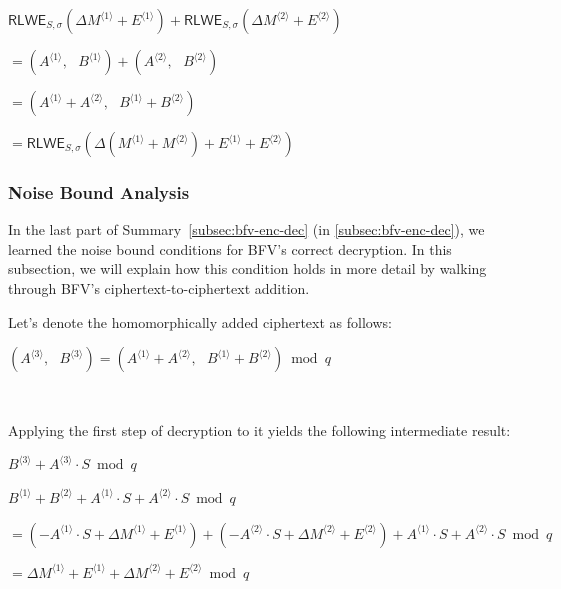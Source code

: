 \begin{tcolorbox}[title={\textbf{\tboxlabel{\ref*{subsec:bfv-add-cipher}} BFV Ciphertext-to-Ciphertext Addition}}]
$\textsf{RLWE}_{S, \sigma}(\Delta M^{\langle 1 \rangle} + E^{\langle 1 \rangle} ) + \textsf{RLWE}_{S, \sigma}(\Delta M^{\langle 2 \rangle} + E^{\langle 2 \rangle}) $

$ = ( A^{\langle 1 \rangle}, \text{ } B^{\langle 1 \rangle}) + (A^{\langle 2 \rangle}, \text{ } B^{\langle 2 \rangle}) $

$ = ( A^{\langle 1 \rangle} + A^{\langle 2 \rangle}, \text{ } B^{\langle 1 \rangle} + B^{\langle 2 \rangle} ) $

$= \textsf{RLWE}_{S, \sigma}(\Delta(M^{\langle 1 \rangle} + M^{\langle 2 \rangle}) + E^{\langle 1 \rangle} + E^{\langle 2 \rangle})$
\end{tcolorbox}


\subsubsection{Noise Bound Analysis}
\label{subsubsec:bfv-noise-analysis}

In the last part of Summary~\ref*{subsec:bfv-enc-dec} (in \autoref{subsec:bfv-enc-dec}), we learned the noise bound conditions for BFV's correct decryption. In this subsection, we will explain how this condition holds in more detail by walking through BFV's ciphertext-to-ciphertext addition. 

Let's denote the homomorphically added ciphertext as follows: 

$ ( A^{\langle 3 \rangle}, \text{ } B^{\langle 3 \rangle}) = ( A^{\langle 1 \rangle} + A^{\langle 2 \rangle}, \text{ } B^{\langle 1 \rangle} + B^{\langle 2 \rangle} ) \bmod q$

$ $

Applying the first step of decryption to it yields the following intermediate result:

$B^{\langle 3 \rangle} + A^{\langle 3 \rangle}\cdot S \bmod q$

$B^{\langle 1 \rangle} + B^{\langle 2 \rangle} + A^{\langle 1 \rangle}\cdot S + A^{\langle 2 \rangle}\cdot S \bmod q$

$= (-A^{\langle 1 \rangle}\cdot S + \Delta M^{\langle 1\rangle} + E^{\langle 1 \rangle}) + (- A^{\langle 2 \rangle}\cdot S  + \Delta M^{\langle 2\rangle}  + E^{\langle 2 \rangle}) + A^{\langle 1 \rangle}\cdot S + A^{\langle 2 \rangle}\cdot S \bmod q$

$= \Delta M^{\langle 1\rangle} + E^{\langle 1 \rangle} + \Delta M^{\langle 2\rangle} + E^{\langle 2 \rangle} \bmod q $

